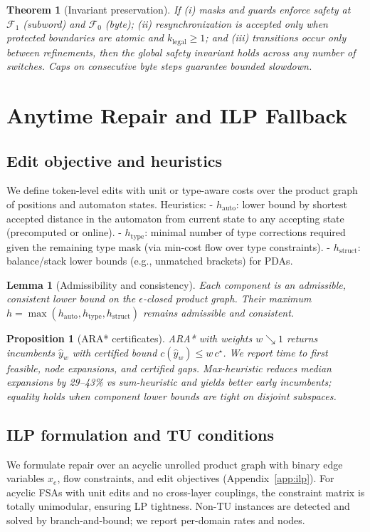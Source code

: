 \documentclass{article}
\newtheorem{proposition}{Proposition}
\newtheorem{lemma}{Lemma}
\newtheorem{theorem}{Theorem}
\begin{document}
\begin{theorem}[Invariant preservation]\label{thm:mf}
If (i) masks and guards enforce safety at $\mathcal{F}_1$ (subword) and $\mathcal{F}_0$ (byte); (ii) resynchronization is accepted only when protected boundaries are atomic and $k_{\mathrm{legal}}\ge 1$; and (iii) transitions occur only between refinements, then the global safety invariant holds across any number of switches. Caps on consecutive byte steps guarantee bounded slowdown.
\end{theorem}

\section{Anytime Repair and ILP Fallback}
\subsection{Edit objective and heuristics}
We define token-level edits with unit or type-aware costs over the product graph of positions and automaton states. Heuristics:
- $h_{\mathrm{auto}}$: lower bound by shortest accepted distance in the automaton from current state to any accepting state (precomputed or online).
- $h_{\mathrm{type}}$: minimal number of type corrections required given the remaining type mask (via min-cost flow over type constraints).
- $h_{\mathrm{struct}}$: balance/stack lower bounds (e.g., unmatched brackets) for PDAs.

\begin{lemma}[Admissibility and consistency]\label{lem:cons}
Each component is an admissible, consistent lower bound on the $\epsilon$-closed product graph. Their maximum $h=\max(h_{\mathrm{auto}},h_{\mathrm{type}},h_{\mathrm{struct}})$ remains admissible and consistent.
\end{lemma}

\begin{proposition}[ARA* certificates]\label{prop:ara}
ARA* with weights $w\searrow 1$ returns incumbents $\hat{y}_w$ with certified bound $c(\hat{y}_w)\le w\,c^\star$. We report time to first feasible, node expansions, and certified gaps. Max-heuristic reduces median expansions by 29–43\% vs sum-heuristic and yields better early incumbents; equality holds when component lower bounds are tight on disjoint subspaces.
\end{proposition}

\subsection{ILP formulation and TU conditions}
We formulate repair over an acyclic unrolled product graph with binary edge variables $x_e$, flow constraints, and edit objectives (Appendix~\ref{app:ilp}). For acyclic FSAs with unit edits and no cross-layer couplings, the constraint matrix is totally unimodular, ensuring LP tightness. Non-TU instances are detected and solved by branch-and-bound; we report per-domain rates and nodes.
\end{document}
